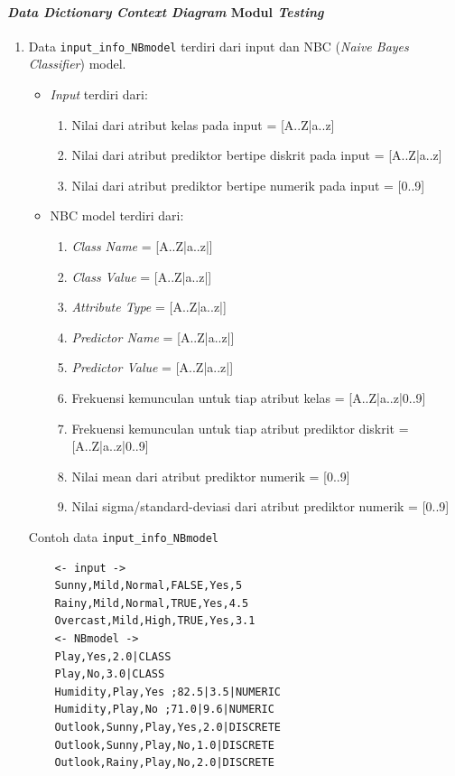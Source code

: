 \paragraph{\textit{Data Dictionary} \textit{Context Diagram} Modul \textit{Testing}}
\begin{enumerate}
	\item{Data \verb|input_info_NBmodel|} terdiri dari input dan NBC (\textit{Naive Bayes Classifier}) model.
	\begin{itemize}
		\item \textit{Input} terdiri dari: 
		\begin{enumerate}
			\item Nilai dari atribut kelas pada input = [A..Z|a..z]
			\item Nilai dari atribut prediktor bertipe diskrit pada input = [A..Z|a..z]
			\item Nilai dari atribut prediktor bertipe numerik pada input = [0..9]
		\end{enumerate}						
		
		\item NBC model terdiri dari:
		\begin{enumerate}
			\item \textit{Class Name} = [A..Z|a..z|]
			\item \textit{Class Value} = [A..Z|a..z|] 
			\item \textit{Attribute Type} = [A..Z|a..z|] 
			\item \textit{Predictor Name} = [A..Z|a..z|]
			\item \textit{Predictor Value} = [A..Z|a..z|]
			\item Frekuensi kemunculan untuk tiap atribut kelas	= [A..Z|a..z|0..9]
			\item Frekuensi kemunculan untuk tiap atribut prediktor diskrit	= [A..Z|a..z|0..9]
			\item Nilai mean dari atribut prediktor numerik = [0..9]
			\item Nilai sigma/standard-deviasi dari atribut prediktor numerik = [0..9]
		\end{enumerate}		
		
	\end{itemize}
	Contoh data \verb|input_info_NBmodel|
	\begin{lstlisting}
	<- input ->
	Sunny,Mild,Normal,FALSE,Yes,5
	Rainy,Mild,Normal,TRUE,Yes,4.5
	Overcast,Mild,High,TRUE,Yes,3.1
	<- NBmodel ->
	Play,Yes,2.0|CLASS
	Play,No,3.0|CLASS
	Humidity,Play,Yes ;82.5|3.5|NUMERIC
	Humidity,Play,No ;71.0|9.6|NUMERIC
	Outlook,Sunny,Play,Yes,2.0|DISCRETE
	Outlook,Sunny,Play,No,1.0|DISCRETE
	Outlook,Rainy,Play,No,2.0|DISCRETE
	\end{lstlisting}
		

\end{enumerate}
